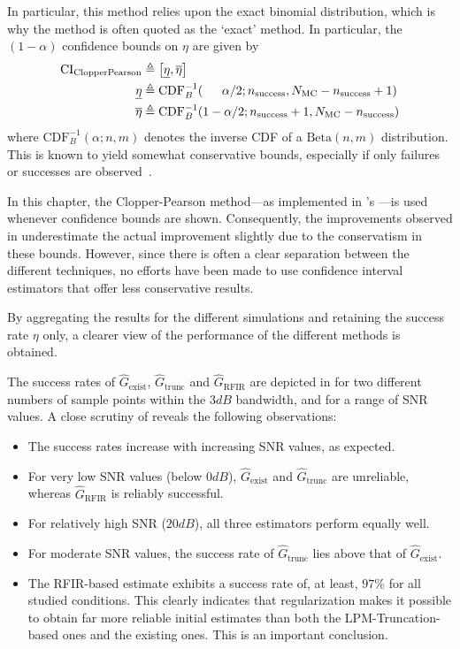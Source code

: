 In particular, this method relies upon the exact binomial distribution, which is why the method is often quoted as the `exact' method.
In particular, the $(1-\alpha)$  confidence bounds on $\eta$ are given by~\citep{Clopper1934}
\begin{align}
 \mathrm{CI}_{\mathrm{ClopperPearson}}  & \triangleq \left[ \underline{\eta}, \overline{\eta} \right]\\
 \underline{\eta} &\triangleq 
  \mathrm{CDF}_B^{-1}(\phantom{1-\;}\alpha/2; n_{\mathrm{success}}, N_{\mathrm{MC}} - n_{\mathrm{success}} + 1)\\
  \overline{\eta} &\triangleq
  \mathrm{CDF}_B^{-1}(1-\alpha/2; n_{\mathrm{success}} + 1, N_{\mathrm{MC}} - n_{\mathrm{success}})
\end{align}
where $\mathrm{CDF}_B^{-1}(\alpha; n,m)$ denotes the inverse \gls{CDF} of a $\mathrm{Beta}(n,m)$ distribution.
This is known to yield somewhat conservative bounds, especially if only failures or successes are observed~\citep{Ross2003}.

In this chapter, the Clopper-Pearson method---as implemented in \MATLAB's ---is used whenever confidence bounds are shown.
Consequently, the improvements observed in  underestimate the actual improvement slightly due to the conservatism in these bounds.
However, since there is often a clear separation between the different techniques, no efforts have been made to use confidence interval estimators that offer less conservative results.

By aggregating the results for the different simulations and retaining the success rate $\eta$ only, a clearer view of the performance of the different methods is obtained.

The success rates of $\hat G_\mathrm{exist}$, $\hat G_\mathrm{trunc}$ and $\hat G_\mathrm{RFIR}$ are depicted in   for two different numbers of sample points within the $3\unit{dB}$ bandwidth, and for a range of SNR values. A close scrutiny of   reveals the following observations: \begin{itemize}
\item The success rates increase with increasing SNR values, as expected.
\item For very low SNR values (below $0\unit{dB}$), $\hat G_\mathrm{exist}$ and $\hat G_\mathrm{trunc}$ are unreliable, whereas $\hat G_\mathrm{RFIR}$ is reliably successful. 
\item For relatively high SNR ($20\unit{dB}$), all three estimators perform equally well.
\item For moderate SNR values, the success rate of $\hat G_\mathrm{trunc}$ lies above that of $\hat G_\mathrm{exist}$.
\item The RFIR-based estimate exhibits a success rate of, at least, $97\%$ for all studied conditions. 
This clearly indicates that regularization makes it possible to obtain far more reliable initial estimates than both the LPM-Truncation-based ones and the existing ones. 
This is an important conclusion.
\end{itemize}

